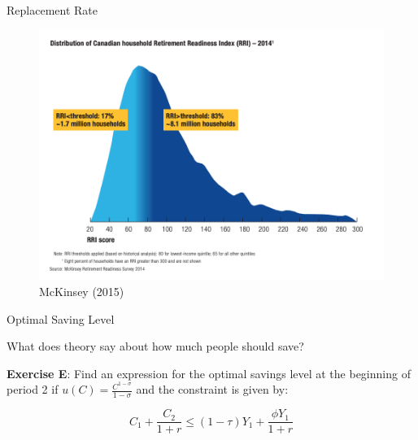 \documentclass[handout]{beamer}
\begin{document}
\begin{frame}{Replacement Rate}

\begin{figure}
\includegraphics[scale=0.4]{mckinsey.png} 
\caption{McKinsey (2015)}
\end{figure}
	
\end{frame}

\begin{frame}{Optimal Saving Level}

What does theory say about how much people should save?\vspace{0.25in}

\textbf{Exercise E}: Find an expression for the optimal savings level at the beginning of period 2 if $u(C)=\frac{C^{1-\sigma}}{1-\sigma}$ and the constraint is given by:

$$ C_1 + \frac{C_2}{1+r} \leq (1-\tau)Y_1 + \frac{\phi Y_1}{1+r}  $$ 

\end{frame}
\end{document}
